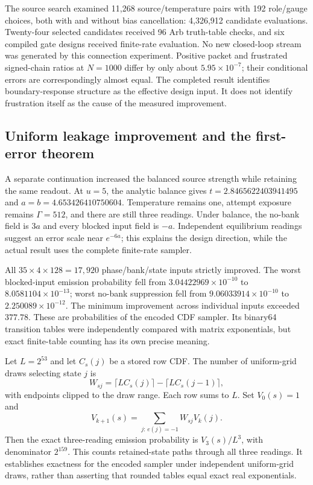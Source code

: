 The source search examined 11,268 source/temperature pairs with 192 role/gauge choices, both with and without bias cancellation: 4,326,912 candidate evaluations. Twenty-four selected candidates received 96 Arb truth-table checks, and six compiled gate designs received finite-rate evaluation. No new closed-loop stream was generated by this connection experiment. Positive packet and frustrated signed-chain ratios at $N=1000$ differ by only about $5.95\times10^{-7}$; their conditional errors are correspondingly almost equal. The completed result identifies boundary-response structure as the effective design input. It does not identify frustration itself as the cause of the measured improvement.

\subsection{Uniform leakage improvement and the first-error theorem}

A separate continuation increased the balanced source strength while retaining the same readout. At $u=5$, the analytic balance gives $t=2.8465622403941495$ and $a=b=4.653426410750604$. Temperature remains one, attempt exposure remains $\Gamma=512$, and there are still three readings. Under balance, the no-bank field is $3a$ and every blocked input field is $-a$. Independent equilibrium readings suggest an error scale near $e^{-6a}$; this explains the design direction, while the actual result uses the complete finite-rate sampler.

All $35\times4\times128=17,920$ phase/bank/state inputs strictly improved. The worst blocked-input emission probability fell from $3.04422969\times10^{-10}$ to $8.0581104\times10^{-13}$; worst no-bank suppression fell from $9.06033914\times10^{-10}$ to $2.250089\times10^{-12}$. The minimum improvement across individual inputs exceeded $377.78$. These are probabilities of the encoded CDF sampler. Its binary64 transition tables were independently compared with matrix exponentials, but exact finite-table counting has its own precise meaning.

Let $L=2^{53}$ and let $C_s(j)$ be a stored row CDF. The number of uniform-grid draws selecting state $j$ is
\[
 W_{sj}=\lceil LC_s(j)\rceil-\lceil LC_s(j-1)\rceil,
\]
with endpoints clipped to the draw range. Each row sums to $L$. Set $V_0(s)=1$ and
\[
 V_{k+1}(s)=\sum_{j:\,e(j)=-1}W_{sj}V_k(j).
\]
Then the exact three-reading emission probability is $V_3(s)/L^3$, with denominator $2^{159}$. This counts retained-state paths through all three readings. It establishes exactness for the encoded sampler under independent uniform-grid draws, rather than asserting that rounded tables equal exact real exponentials.

